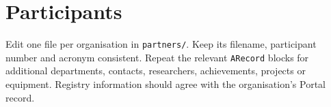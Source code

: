 \clearpage
\section{Participants}
\begin{heguidance}
Edit one file per organisation in \texttt{partners/}. Keep its filename, participant
number and acronym consistent. Repeat the relevant \texttt{ARecord} blocks for
additional departments, contacts, researchers, achievements, projects or equipment.
Registry information should agree with the organisation's Portal record.
\end{heguidance}
\HEPrintPartners
